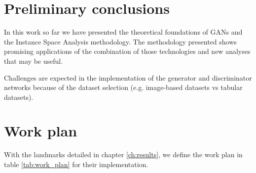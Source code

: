 \section{Preliminary conclusions}

In this work so far we have presented the theoretical foundations of GANs and the Instance Space Analysis methodology. The methodology presented shows promising applications of the combination of those technologies and new analyses that may be useful.

Challenges are expected in the implementation of the generator and discriminator networks because of the dataset selection (e.g. image-based datasets vs tabular datasets). 

\section{Work plan}

With the landmarks detailed in chapter \ref{ch:results}, we define the work plan in table \ref{tab:work_plan} for their implementation.


